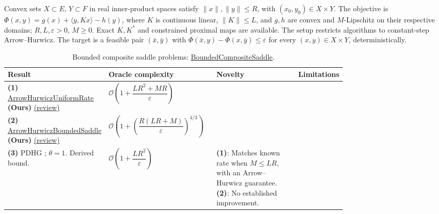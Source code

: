 \begin{table}[tp]
\centering
\caption{Bounded composite saddle problems: \href{https://github.com/k3nfalt/longtails/blob/main/LongTails/Setups/BoundedCompositeSaddle.lean}{BoundedCompositeSaddle}.}\label{tab:BoundedCompositeSaddle}
\parbox{\linewidth}{\footnotesize Convex sets $X\subset E$, $Y\subset F$ in real inner-product spaces satisfy $\|x\|,\|y\|\le R$, with $(x_0,y_0)\in X\times Y$. The objective is $\Phi(x,y)=g(x)+\langle y,Kx\rangle-h(y)$, where $K$ is continuous linear, $\|K\|\le L$, and $g,h$ are convex and $M$-Lipschitz on their respective domains; $R,L,\varepsilon>0$, $M\ge0$. Exact $K,K^*$ and constrained proximal maps are available. The setup restricts algorithms to constant-step Arrow--Hurwicz. The target is a feasible pair $(\bar x,\bar y)$ with $\Phi(\bar x,y)-\Phi(x,\bar y)\le\varepsilon$ for every $(x,y)\in X\times Y$, deterministically.}\par\smallskip
\begin{threeparttable}
\footnotesize
\setlength{\tabcolsep}{4pt}\renewcommand{\arraystretch}{1.25}
\begin{tabularx}{\linewidth}{@{}>{\raggedright\arraybackslash}p{0.20\linewidth}>{\raggedright\arraybackslash}p{0.32\linewidth}>{\raggedright\arraybackslash}p{0.25\linewidth}>{\raggedright\arraybackslash}X@{}}
\toprule
\textbf{Result} & \textbf{Oracle complexity} & \textbf{Novelty} & \textbf{Limitations} \\
\midrule
\textbf{(1)} \href{https://github.com/k3nfalt/longtails/blob/main/LongTails/Theorems/ArrowHurwiczUniformRate.lean}{Arrow\allowbreak Hurwicz\allowbreak Uniform\allowbreak Rate} \textbf{(Ours)} \href{https://github.com/k3nfalt/longtails/blob/main/scripts/reviews/ArrowHurwiczUniformRate.md}{(review)}
& $\mathcal{O}\!\left(1+\dfrac{LR^2+MR}{\varepsilon}\right)$ & & \\
\midrule
\textbf{(2)} \href{https://github.com/k3nfalt/longtails/blob/main/LongTails/Theorems/ArrowHurwiczBoundedSaddle.lean}{Arrow\allowbreak Hurwicz\allowbreak Bounded\allowbreak Saddle} \textbf{(Ours)} \href{https://github.com/k3nfalt/longtails/blob/main/scripts/reviews/ArrowHurwiczBoundedSaddle.md}{(review)}
& $\mathcal{O}\!\left(1+\left(\dfrac{R(LR+M)}{\varepsilon}\right)^{4/3}\right)$ & & \\
\midrule[1.2pt]
\textbf{(3)} PDHG \citep[Thm.~1(b), Eq.~(16)]{cp2010boundedcomparison}; $\theta=1$. Derived bound.
& $\mathcal{O}\!\left(1+\dfrac{LR^2}{\varepsilon}\right)$
& \textbf{(1)}: Matches known rate when $M\le LR$, with an Arrow--Hurwicz guarantee. \textbf{(2)}: No established improvement.

\end{tabularx}
\end{threeparttable}
\end{table}
